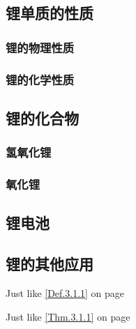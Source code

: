 \documentclass[color=orange]{textbook-cn}%
\begin{document}
\begin{Paracol}
\subsection{锂单质的性质}
\lipsum[2][1-8]
\subsubsection{锂的物理性质}
\lipsum[1-2]
\subsubsection{锂的化学性质}
\lipsum[1-2]
\subsection{锂的化合物}
\lipsum[2][1-8]
\subsubsection{氢氧化锂}
\lipsum[1-2]
\subsubsection{氧化锂}
\lipsum[1-3]

\begin{Block}[文字标题]
\lipsum[2]
\end{Block}


\begin{Block}
\lipsum[2]
\end{Block}

\subsection{锂电池}
\lipsum[1-2]
\subsection{锂的其他应用}
\lipsum[1-2]
\begin{Definition}[定义名称]
\lipsum[1][1-3]
\end{Definition}

Just like \ref{Def.3.1.1} on page \pageref{Def.3.1.1}


\begin{Theorem*}[定理名称]
\lipsum[1][1-3]
\end{Theorem*}

Just like \ref{Thm.3.1.1} on page \pageref{Thm.3.1.1}

\end{Paracol}
\end{document}
